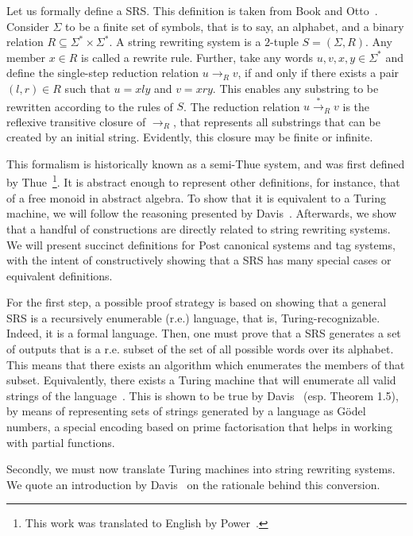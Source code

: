 \documentclass[12pt]{article}
\begin{document}
Let us formally define a SRS. This definition is taken from Book and Otto~\cite[Sec. 2.1]{Book:book:1993}. Consider $\Sigma$ to be a finite set of symbols, that is to say, an alphabet, and a binary relation $R \subseteq \Sigma^{*} \times \Sigma^{*}$. A string rewriting system is a $2$-tuple $S = (\Sigma, R)$. Any member $x \in R$ is called a rewrite rule. Further, take any words $u, v, x, y \in \Sigma^{*}$ and define the single-step reduction relation $u \rightarrow_{R} v$, if and only if there exists a pair $(l, r) \in R$ such that $u = xly$ and $v = xry$. This enables any substring to be rewritten according to the rules of $S$. The reduction relation $u \stackrel{*}{\rightarrow}_{R} v$ is the reflexive transitive closure of $\rightarrow_{R}$, that represents all substrings that can be created by an initial string. Evidently, this closure may be finite or infinite.

This formalism is historically known as a semi-Thue system, and was first defined by Thue~\cite{Thue:article:1914:may}\footnote{This work was translated to English by Power~\cite{Power:misc:2013:aug}.}. It is abstract enough to represent other definitions, for instance, that of a free monoid in abstract algebra. To show that it is equivalent to a Turing machine, we will follow the reasoning presented by Davis~\cite{Davis:book:1958}. Afterwards, we show that a handful of constructions are directly related to string rewriting systems. We will present succinct definitions for Post canonical systems and tag systems, with the intent of constructively showing that a SRS has many special cases or equivalent definitions.

For the first step, a possible proof strategy is based on showing that a general SRS is a recursively enumerable (r.e.) language, that is, Turing-recognizable. Indeed, it is a formal language. Then, one must prove that a SRS generates a set of outputs that is a r.e. subset of the set of all possible words over its alphabet. This means that there exists an algorithm which enumerates the members of that subset. Equivalently, there exists a Turing machine that will enumerate all valid strings of the language~\cite[Theorem 3.21]{Sipser:book:2012}. This is shown to be true by Davis~\cite[pp. 84--86]{Davis:book:1958} (esp. Theorem 1.5), by means of representing sets of strings generated by a language as Gödel numbers, a special encoding based on prime factorisation that helps in working with partial functions.

Secondly, we must now translate Turing machines into string rewriting systems. We quote an introduction by Davis~\cite[Sec. 6.2]{Davis:book:1958} on the rationale behind this conversion.
\end{document}
